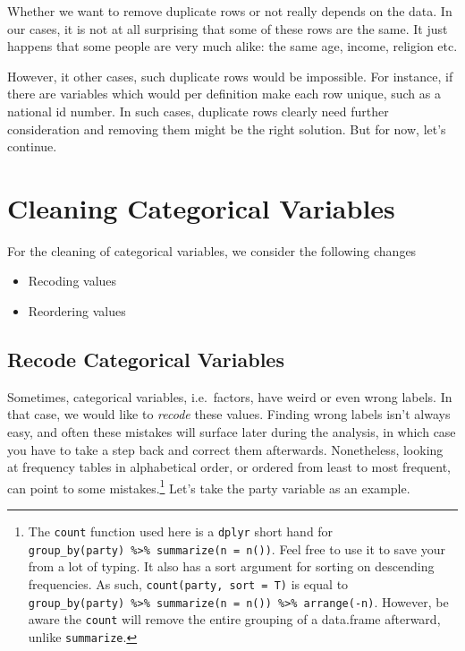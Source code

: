 \documentclass[]{tufte-book}
\providecommand{\tightlist}{%
  \setlength{\itemsep}{0pt}\setlength{\parskip}{0pt}}
\begin{document}
Whether we want to remove duplicate rows or not really depends on the
data. In our cases, it is not at all surprising that some of these rows
are the same. It just happens that some people are very much alike: the
same age, income, religion etc.

However, it other cases, such duplicate rows would be impossible. For
instance, if there are variables which would per definition make each
row unique, such as a national id number. In such cases, duplicate rows
clearly need further consideration and removing them might be the right
solution. But for now, let's continue.

\section{Cleaning Categorical
Variables}\label{cleaning-categorical-variables}

For the cleaning of categorical variables, we consider the following
changes

\begin{itemize}
\tightlist
\item
  Recoding values
\item
  Reordering values
\end{itemize}

\subsection{Recode Categorical
Variables}\label{recode-categorical-variables}

Sometimes, categorical variables, i.e.~factors, have weird or even wrong
labels. In that case, we would like to \emph{recode} these values.
Finding wrong labels isn't always easy, and often these mistakes will
surface later during the analysis, in which case you have to take a step
back and correct them afterwards. Nonetheless, looking at frequency
tables in alphabetical order, or ordered from least to most frequent,
can point to some mistakes.\footnote{The \texttt{count} function used
  here is a \texttt{dplyr} short hand for
  \texttt{group\_by(party)\ \%\textgreater{}\%\ summarize(n\ =\ n())}.
  Feel free to use it to save your from a lot of typing. It also has a
  sort argument for sorting on descending frequencies. As such,
  \texttt{count(party,\ sort\ =\ T)} is equal to
  \texttt{group\_by(party)\ \%\textgreater{}\%\ summarize(n\ =\ n())\ \%\textgreater{}\%\ arrange(-n)}.
  However, be aware the \texttt{count} will remove the entire grouping
  of a data.frame afterward, unlike \texttt{summarize}.} Let's take the
party variable as an example.
\end{document}
